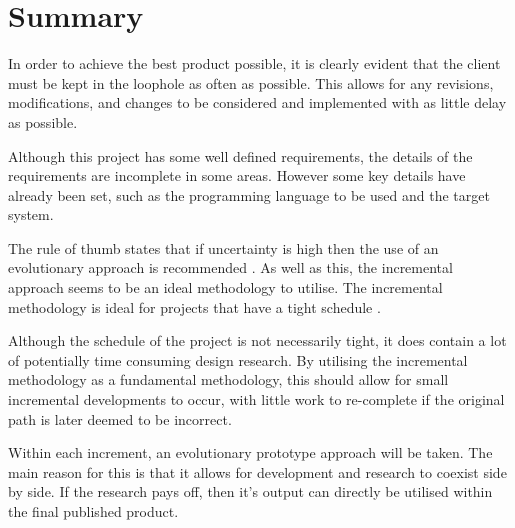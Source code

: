\section{Summary}
In order to achieve the best product possible, it is clearly evident that the 
client must be kept in the loophole as often as possible. This allows for any 
revisions, modifications, and changes to be considered and implemented with as 
little delay as possible.

Although this project has some well defined requirements, the details of the 
requirements are incomplete in some areas. However some key details have 
already been set, such as the programming language to be used and the target 
system. 

The rule of thumb states that if uncertainty is high then the use of an 
evolutionary approach is recommended \citep{hughes_cotterell09}. As well as 
this, the incremental approach seems to be an ideal methodology to utilise. 
The incremental methodology is ideal for projects that have a tight schedule 
\citet{hughes_cotterell09}.

Although the schedule of the project is not necessarily tight, it does contain 
a lot of potentially time consuming design research. By utilising the 
incremental methodology as a fundamental methodology, this should allow for 
small incremental developments to occur, with little work to re-complete if the
original path is later deemed to be incorrect.

Within each increment, an evolutionary prototype approach will be taken. The 
main reason for this is that it allows for development and research to coexist 
side by side. If the research pays off, then it's output can directly be 
utilised within the final published product.